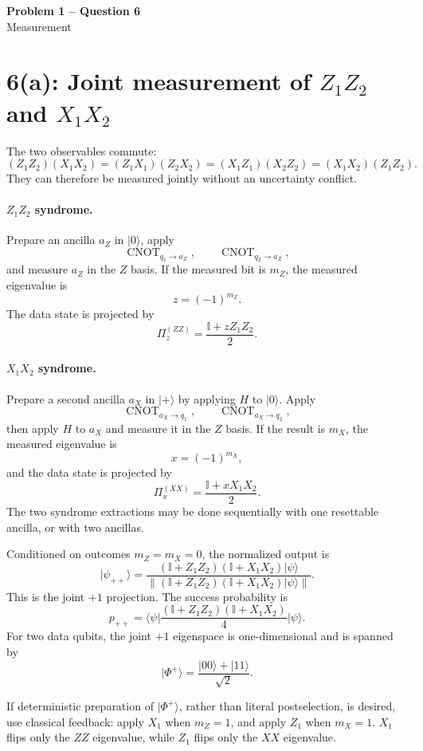 \documentclass[11pt]{article}
\newcommand{\ket}[1]{\lvert #1\rangle}
\newcommand{\bra}[1]{\langle #1\rvert}
\newcommand{\I}{\mathbb{I}}
\newcommand{\CNOT}[2]{\operatorname{CNOT}_{#1\to #2}}
\begin{document}
\begin{center}
  {\Large\bfseries Problem 1 -- Question 6}\\[0.3em]
  {\large Measurement}
\end{center}

\section*{6(a): Joint measurement of \(Z_1Z_2\) and \(X_1X_2\)}

The two observables commute:
\[
 (Z_1Z_2)(X_1X_2)
 =(Z_1X_1)(Z_2X_2)
 =(X_1Z_1)(X_2Z_2)
 =(X_1X_2)(Z_1Z_2).
\]
They can therefore be measured jointly without an uncertainty
conflict.

\paragraph{\(Z_1Z_2\) syndrome.}
Prepare an ancilla \(a_Z\) in \(\ket0\), apply
\[
 \CNOT{q_1}{a_Z},\qquad \CNOT{q_2}{a_Z},
\]
and measure \(a_Z\) in the \(Z\) basis. If the measured bit is \(m_Z\),
the measured eigenvalue is
\[
 z=(-1)^{m_Z}.
\]
The data state is projected by
\[
 \Pi^{(ZZ)}_{z}=\frac{\I+zZ_1Z_2}{2}.
\]

\paragraph{\(X_1X_2\) syndrome.}
Prepare a second ancilla \(a_X\) in \(\ket+\) by applying \(H\) to
\(\ket0\). Apply
\[
 \CNOT{a_X}{q_1},\qquad \CNOT{a_X}{q_2},
\]
then apply \(H\) to \(a_X\) and measure it in the \(Z\) basis. If the
result is \(m_X\), the measured eigenvalue is
\[
 x=(-1)^{m_X},
\]
and the data state is projected by
\[
 \Pi^{(XX)}_{x}=\frac{\I+xX_1X_2}{2}.
\]
The two syndrome extractions may be done sequentially with one resettable
ancilla, or with two ancillas.

Conditioned on outcomes \(m_Z=m_X=0\), the normalized output is
\[
\boxed{
\ket{\psi_{++}}
=\frac{(\I+Z_1Z_2)(\I+X_1X_2)\ket\psi}
{\left\|(\I+Z_1Z_2)(\I+X_1X_2)\ket\psi\right\|}.
}
\]
This is the joint \(+1\) projection. The success probability is
\[
 p_{++}
 =\bra\psi
 \frac{(\I+Z_1Z_2)(\I+X_1X_2)}{4}
 \ket\psi.
\]
For two data qubits, the joint \(+1\) eigenspace is one-dimensional and
is spanned by
\[
 \ket{\Phi^+}=\frac{\ket{00}+\ket{11}}{\sqrt2}.
\]

If deterministic preparation of \(\ket{\Phi^+}\), rather than literal
postselection, is desired, use classical feedback: apply \(X_1\) when
\(m_Z=1\), and apply \(Z_1\) when \(m_X=1\). \(X_1\) flips only the
\(ZZ\) eigenvalue, while \(Z_1\) flips only the \(XX\) eigenvalue.
\end{document}
